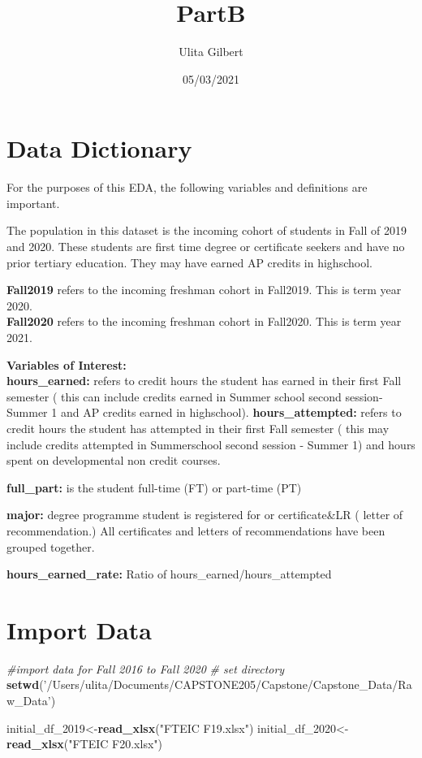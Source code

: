 \documentclass[]{article}
\title{PartB}
\author{Ulita Gilbert}
\date{05/03/2021}
\newenvironment{Shaded}{\begin{snugshade}}{\end{snugshade}}
\newcommand{\CommentTok}[1]{\textcolor[rgb]{0.56,0.35,0.01}{\textit{#1}}}
\newcommand{\DecValTok}[1]{\textcolor[rgb]{0.00,0.00,0.81}{#1}}
\newcommand{\KeywordTok}[1]{\textcolor[rgb]{0.13,0.29,0.53}{\textbf{#1}}}
\newcommand{\NormalTok}[1]{#1}
\newcommand{\StringTok}[1]{\textcolor[rgb]{0.31,0.60,0.02}{#1}}
\begin{document}
\maketitle

{
\setcounter{tocdepth}{2}
\tableofcontents
}
\hypertarget{data-dictionary}{%
\section{Data Dictionary}\label{data-dictionary}}

For the purposes of this EDA, the following variables and definitions
are important.

The population in this dataset is the incoming cohort of students in
Fall of 2019 and 2020. These students are first time degree or
certificate seekers and have no prior tertiary education. They may have
earned AP credits in highschool.

\textbf{Fall2019} refers to the incoming freshman cohort in Fall2019.
This is term year 2020.\\
\textbf{Fall2020} refers to the incoming freshman cohort in Fall2020.
This is term year 2021.

\textbf{Variables of Interest:}\\
\textbf{hours\_earned:} refers to credit hours the student has earned in
their first Fall semester ( this can include credits earned in Summer
school second session- Summer 1 and AP credits earned in highschool).
\textbf{hours\_attempted:} refers to credit hours the student has
attempted in their first Fall semester ( this may include credits
attempted in Summerschool second session - Summer 1) and hours spent on
developmental non credit courses.

\textbf{full\_part:} is the student full-time (FT) or part-time (PT)

\textbf{major:} degree programme student is registered for or
certificate\&LR ( letter of recommendation.) All certificates and
letters of recommendations have been grouped together.

\textbf{hours\_earned\_rate:} Ratio of hours\_earned/hours\_attempted

\hypertarget{import-data}{%
\section{Import Data}\label{import-data}}

\begin{Shaded}
\begin{Highlighting}[]
\CommentTok{#import data for Fall 2016 to Fall 2020}
\CommentTok{# set directory}
\KeywordTok{setwd}\NormalTok{(}\StringTok{'/Users/ulita/Documents/CAPSTONE205/Capstone/Capstone_Data/Raw_Data'}\NormalTok{)}

\NormalTok{initial_df_}\DecValTok{2019}\NormalTok{<-}\KeywordTok{read_xlsx}\NormalTok{(}\StringTok{"FTEIC F19.xlsx"}\NormalTok{)}
\NormalTok{initial_df_}\DecValTok{2020}\NormalTok{<-}\KeywordTok{read_xlsx}\NormalTok{(}\StringTok{"FTEIC F20.xlsx"}\NormalTok{)}
\end{Highlighting}
\end{Shaded}
\end{document}
